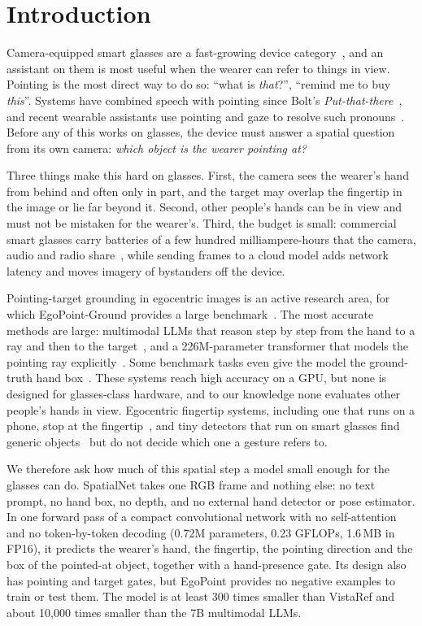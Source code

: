 \section{Introduction}\label{sec:intro}

Camera-equipped smart glasses are a fast-growing device category~\cite{idc2026xr,counterpoint2026aiglasses}, and an assistant on them is most useful when the wearer can refer to things in view. Pointing is the most direct way to do so: ``what is \emph{that}?'', ``remind me to buy \emph{this}''. Systems have combined speech with pointing since Bolt's \emph{Put-that-there}~\cite{bolt1980put}, and recent wearable assistants use pointing and gaze to resolve such pronouns~\cite{lee2024gazepointar}. Before any of this works on glasses, the device must answer a spatial question from its own camera: \emph{which object is the wearer pointing at?}

Three things make this hard on glasses. First, the camera sees the wearer's hand from behind and often only in part, and the target may overlap the fingertip in the image or lie far beyond it. Second, other people's hands can be in view and must not be mistaken for the wearer's. Third, the budget is small: commercial smart glasses carry batteries of a few hundred milliampere-hours that the camera, audio and radio share~\cite{yuan2026aiglasses}, while sending frames to a cloud model adds network latency and moves imagery of bystanders off the device.

Pointing-target grounding in egocentric images is an active research area, for which EgoPoint-Ground provides a large benchmark~\cite{egopoint}. The most accurate methods are large: multimodal LLMs that reason step by step from the hand to a ray and then to the target~\cite{egopoint,li2026pointvgr}, and a 226M-parameter transformer that models the pointing ray explicitly~\cite{li2026vistaref}. Some benchmark tasks even give the model the ground-truth hand box~\cite{egopoint}. These systems reach high accuracy on a GPU, but none is designed for glasses-class hardware, and to our knowledge none evaluates other people's hands in view. Egocentric fingertip systems, including one that runs on a phone, stop at the fingertip~\cite{huang2016pointing,jain2019gestarlite}, and tiny detectors that run on smart glasses find generic objects~\cite{moosmann2024tinyissimoyolo} but do not decide which one a gesture refers to.

We therefore ask how much of this spatial step a model small enough for the glasses can do. SpatialNet takes one RGB frame and nothing else: no text prompt, no hand box, no depth, and no external hand detector or pose estimator. In one forward pass of a compact convolutional network with no self-attention and no token-by-token decoding (0.72M parameters, 0.23 GFLOPs, 1.6\,MB in FP16), it predicts the wearer's hand, the fingertip, the pointing direction and the box of the pointed-at object, together with a hand-presence gate. Its design also has pointing and target gates, but EgoPoint provides no negative examples to train or test them. The model is at least 300 times smaller than VistaRef and about 10{,}000 times smaller than the 7B multimodal LLMs.

